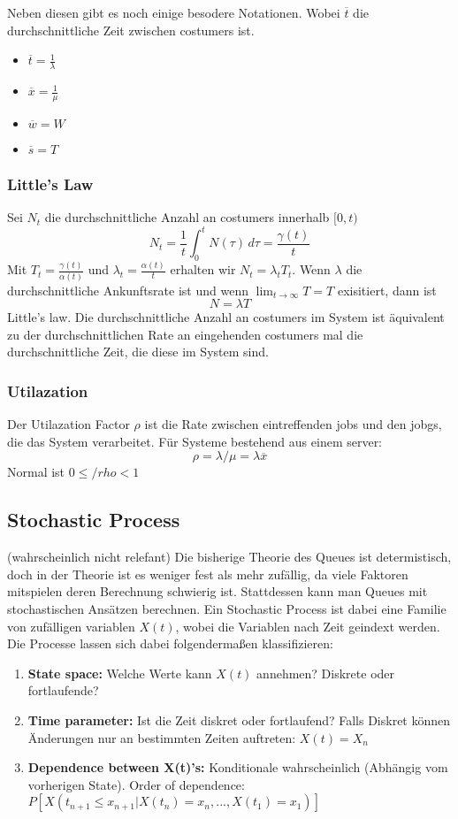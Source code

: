 	Neben diesen gibt es noch einige besodere Notationen. Wobei $\overline{t}$ die durchschnittliche Zeit zwischen costumers ist.  
	\begin{itemize}
		\item $\overline{t} = \frac{1}{\lambda}$
		\item $\overline{x} = \frac{1}{\mu}$
		\item $\overline{w} = W$
		\item $\overline{s} = T$
	\end{itemize}

	\subsubsection{Little's Law} 
		Sei $N_t$ die durchschnittliche Anzahl an costumers innerhalb $[0,t)$ 
		$$
			N_t = \frac{1}{t} { \int_{0}^{t} N(\tau) \,d\tau } = \frac{\gamma(t)}{t}
		$$
		Mit $T_t = \frac{\gamma(t)}{\alpha (t)}$ und $\lambda_t = \frac{\alpha(t)}{t}$ erhalten wir $N_t = \lambda_tT_t$. Wenn $\lambda$ die durchschnittliche Ankunftsrate ist und wenn $\lim_{t \to \infty} T = T$  exisitiert, dann ist 
		$$
			N = \lambda T
		$$ Little's law. 
		Die durchschnittliche Anzahl an costumers im System ist äquivalent zu der durchschnittlichen Rate an eingehenden costumers mal die durchschnittliche Zeit, die diese im System sind. 
	
	\subsubsection{Utilazation}
		Der Utilazation Factor $\rho$ ist die Rate zwischen eintreffenden jobs und den jobgs, die das System verarbeitet. Für Systeme bestehend aus einem server: 
		$$
			\rho = \lambda / \mu = \lambda\overline{x}
		$$ 
		Normal ist $0 \le /rho < 1$

	\subsection{Stochastic Process}
		(wahrscheinlich nicht relefant)
		Die bisherige Theorie des Queues ist determistisch, doch in der Theorie ist es weniger fest als mehr zufällig, da viele Faktoren mitspielen deren Berechnung schwierig ist. Stattdessen kann man Queues mit stochastischen Ansätzen berechnen. Ein Stochastic Process ist dabei eine Familie von zufälligen variablen $X(t)$, wobei die Variablen nach Zeit geindext werden. Die Processe lassen sich dabei folgendermaßen klassifizieren:
		\begin{enumerate}
			\item \textbf{State space:} Welche Werte kann $X(t)$ annehmen? Diskrete oder fortlaufende?
			\item \textbf{Time parameter:} Ist die Zeit diskret oder fortlaufend? Falls Diskret können Änderungen nur an bestimmten Zeiten auftreten: $X(t) = X_n$
			\item \textbf{Dependence between X(t)’s:} Konditionale wahrscheinlich (Abhängig vom vorherigen State). Order of dependence: $P[X(t_{n+1} \le x_{n+1} | X(t_n) = x_n,...,X(t_1)=x_1)]$
		\end{enumerate}

